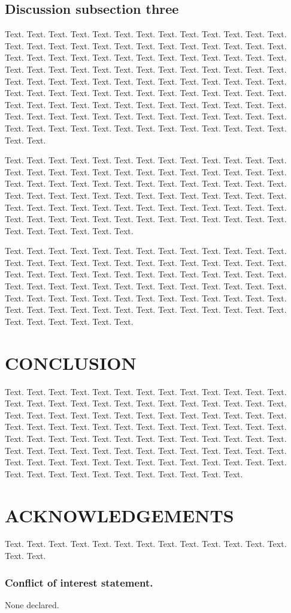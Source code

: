 \documentclass[a4,center,fleqn]{NAR}
\begin{document}
\subsection{Discussion subsection three}

Text. Text. Text. Text. Text. Text. Text. Text. Text. Text. Text.
Text. Text. Text. Text. Text. Text. Text. Text. Text. Text. Text.
Text. Text. Text. Text. Text. Text. Text. Text. Text. Text. Text.
Text. Text. Text. Text. Text. Text. Text. Text. Text. Text. Text.
Text. Text. Text. Text. Text. Text. Text. Text. Text. Text. Text.
Text. Text. Text. Text. Text. Text. Text. Text. Text. Text. Text.
Text. Text. Text. Text. Text. Text. Text. Text. Text. Text. Text.
Text. Text. Text. Text. Text. Text. Text. Text. Text. Text. Text.
Text. Text. Text. Text. Text. Text. Text. Text. Text. Text. Text.
Text. Text. Text. Text. Text. Text. Text. Text. Text. Text. Text.
Text. Text. Text. Text. Text. Text. Text. Text. Text.

Text. Text. Text. Text. Text. Text. Text. Text. Text. Text. Text.
Text. Text. Text. Text. Text. Text. Text. Text. Text. Text. Text.
Text. Text. Text. Text. Text. Text. Text. Text. Text. Text. Text.
Text. Text. Text. Text. Text. Text. Text. Text. Text. Text. Text.
Text. Text. Text. Text. Text. Text. Text. Text. Text. Text. Text.
Text. Text. Text. Text. Text. Text. Text. Text. Text. Text. Text.
Text. Text. Text. Text. Text. Text. Text. Text. Text. Text. Text.
Text. Text. Text. Text. Text. Text. Text.

Text. Text. Text. Text. Text. Text. Text. Text. Text. Text. Text.
Text. Text. Text. Text. Text. Text. Text. Text. Text. Text. Text.
Text. Text. Text. Text. Text. Text. Text. Text. Text. Text. Text.
Text. Text. Text. Text. Text. Text. Text. Text. Text. Text. Text.
Text. Text. Text. Text. Text. Text. Text. Text. Text. Text. Text.
Text. Text. Text. Text. Text. Text. Text. Text. Text. Text. Text.
Text. Text. Text. Text. Text. Text. Text. Text. Text. Text. Text.
Text. Text. Text. Text. Text. Text. Text.


\section{CONCLUSION}

Text. Text. Text. Text. Text. Text. Text. Text. Text. Text. Text.
Text. Text. Text. Text. Text. Text. Text. Text. Text. Text. Text.
Text. Text. Text. Text. Text. Text. Text. Text. Text. Text. Text.
Text. Text. Text. Text. Text. Text. Text. Text. Text. Text. Text.
Text. Text. Text. Text. Text. Text. Text. Text. Text. Text. Text.
Text. Text. Text. Text. Text. Text. Text. Text. Text. Text. Text.
Text. Text. Text. Text. Text. Text. Text. Text. Text. Text. Text.
Text. Text. Text. Text. Text. Text. Text. Text. Text. Text. Text.
Text. Text. Text. Text. Text. Text. Text. Text. Text. Text. Text.
Text. Text. Text.


\section{ACKNOWLEDGEMENTS}

Text. Text. Text. Text. Text. Text. Text. Text. Text. Text. Text.
Text. Text. Text. Text.


\subsubsection{Conflict of interest statement.} None declared.





\end{document}
